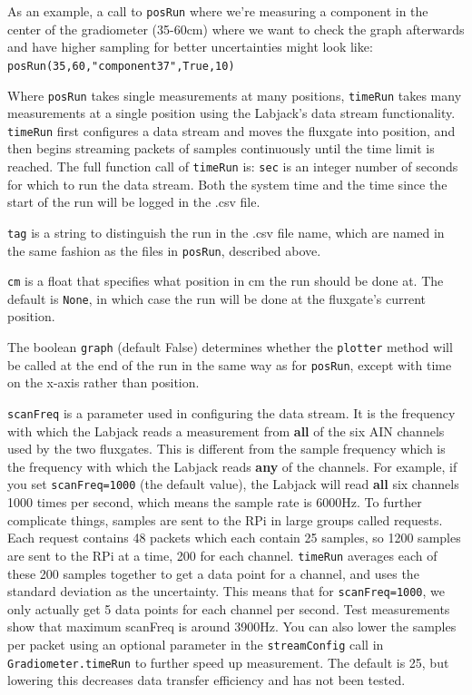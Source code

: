 \documentclass{TheMartianReport}
\newcommand{\pyinline}[1]{\texttt{#1}}
\newcommand{\pyline}[1]{\mint[bgcolor=LightGrey]{python}{#1}}
\begin{document}
As an example, a call to \pyinline{posRun} where we're measuring a component in the center of the gradiometer (35-60cm) where we want to check the graph afterwards and have higher sampling for better uncertainties might look like: \pyinline{posRun(35,60,"component37",True,10)}

Where \pyinline{posRun} takes single measurements at many positions, \pyinline{timeRun} takes many measurements at a single position using the Labjack's data stream functionality. \pyinline{timeRun} first configures a data stream and moves the fluxgate into position, and then begins streaming packets of samples continuously until the time limit is reached. The full function call of \pyinline{timeRun} is:
\pyline{timeRun(sec,tag,scanFreq=1000,cm=None,graph=False)}
\pyinline{sec} is an integer number of seconds for which to run the data stream. Both the system time and the time since the start of the run will be logged in the .csv file.

\pyinline{tag} is a string to distinguish the run in the .csv file name, which are named in the same fashion as the files in \pyinline{posRun}, described above.

\pyinline{cm} is a float that specifies what position in cm the run should be done at. The default is \pyinline{None}, in which case the run will be done at the fluxgate's current position.

The boolean \pyinline{graph} (default False) determines whether the \pyinline{plotter} method will be called at the end of the run in the same way as for \pyinline{posRun}, except with time on the x-axis rather than position.

\pyinline{scanFreq} is a parameter used in configuring the data stream. It is the frequency with which the Labjack reads a measurement from \textbf{all} of the six AIN channels used by the two fluxgates. This is different from the sample frequency which is the frequency with which the Labjack reads \textbf{any} of the channels. For example, if you set \pyinline{scanFreq=1000} (the default value), the Labjack will read \textbf{all} six channels 1000 times per second, which means the sample rate is 6000Hz. To further complicate things, samples are sent to the RPi in large groups called requests. Each request contains 48 packets which each contain 25 samples, so 1200 samples are sent to the RPi at a time, 200 for each channel. \pyinline{timeRun} averages each of these 200 samples together to get a data point for a channel, and uses the standard deviation as the uncertainty. This means that for \pyinline{scanFreq=1000}, we only actually get 5 data points for each channel per second. Test measurements show that maximum scanFreq is around 3900Hz. You can also lower the samples per packet using an optional parameter in the \pyinline{streamConfig} call in \pyinline{Gradiometer.timeRun} to further speed up measurement. The default is 25, but lowering this decreases data transfer efficiency and has not been tested.
\end{document}
